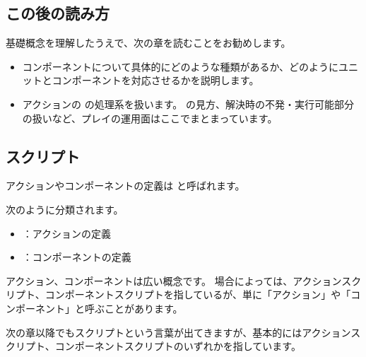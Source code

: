 \documentclass[letterpaper,10pt,dvipdfmx]{sphinxmanual}
\begin{document}
\subsection{この後の読み方}
\label{\detokenize{common/common:id17}}
\sphinxAtStartPar
基礎概念を理解したうえで、次の章を読むことをお勧めします。
\begin{itemize}
\item {} 
\sphinxAtStartPar
{\hyperref[\detokenize{common/common-component:common-component-rst}]{}}
コンポーネントについて具体的にどのような種類があるか、どのようにユニットとコンポーネントを対応させるかを説明します。

\item {} 
\sphinxAtStartPar
{\hyperref[\detokenize{common/common-action:common-action-rst}]{}}
アクションの  の処理系を扱います。
 の見方、解決時の不発・実行可能部分の扱いなど、プレイの運用面はここでまとまっています。

\end{itemize}


\subsection{スクリプト}
\label{\detokenize{common/common:id18}}
\sphinxAtStartPar
アクションやコンポーネントの定義は  と呼ばれます。

\sphinxAtStartPar
次のように分類されます。
\begin{itemize}
\item {} 
\sphinxAtStartPar
{} ：アクションの定義

\item {} 
\sphinxAtStartPar
{} ：コンポーネントの定義

\end{itemize}

\sphinxAtStartPar
アクション、コンポーネントは広い概念です。
場合によっては、アクションスクリプト、コンポーネントスクリプトを指しているが、単に「アクション」や「コンポーネント」と呼ぶことがあります。

\sphinxAtStartPar
次の章以降でもスクリプトという言葉が出てきますが、基本的にはアクションスクリプト、コンポーネントスクリプトのいずれかを指しています。
\end{document}
